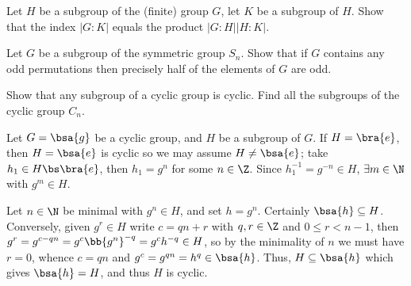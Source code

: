 



\begin{problem}
Let $H$ be a subgroup of the (finite) group $G$, let $K$ be a subgroup of $H$. Show that the index $|G : K|$
equals the product $|G : H||H : K|$.
\end{problem}

\begin{solution}[\bf Solution.]

\end{solution}


\begin{problem}
Let $G$ be a subgroup of the symmetric group $S_n$. Show that if $G$ contains any odd permutations then precisely half of the elements of $G$ are odd.
\end{problem}

\begin{solution}[\bf Solution.]

\end{solution}


\begin{problem}
Show that any subgroup of a cyclic group is cyclic. Find all the subgroups of the cyclic group $C_n$.
\end{problem}

\begin{solution}[\bf Solution.]
Let $G = \bsa{g}$ be a cyclic group, and $H$ be a subgroup of $G$. If $H = \bra{e}$, then $H=\bsa{e}$ is cyclic so we may assume $H \neq \bsa{e}$; take $h_1\in H\bs \bra{e}$, then $h_1 = g^n$ for some $n \in \Z$. Since $h_1^{-1} = g^{-n} \in H$, $\exists m\in \N$ with $g^m \in H$. 

Let $n\in \N$ be minimal with $g^n \in H$, and set $h = g^n$. Certainly $\bsa{h}\subseteq H$. Conversely, given $g^r\in H$ write $c = qn + r$ with $q,r\in \Z$ and $0\leq r < n-1$, then $g^r = g^{c -qn} = g^c \bb{g^n}^{-q} = g^c h^{-q} \in H$, so by the minimality of $n$ we must have $r=0$, whence $c = qn$ and $g^c = g^{qn} = h^q \in \bsa{h}$. Thus, $H\subseteq \bsa{h}$ which gives $\bsa{h} = H$, and thus $H$ is cyclic.
\end{solution}

